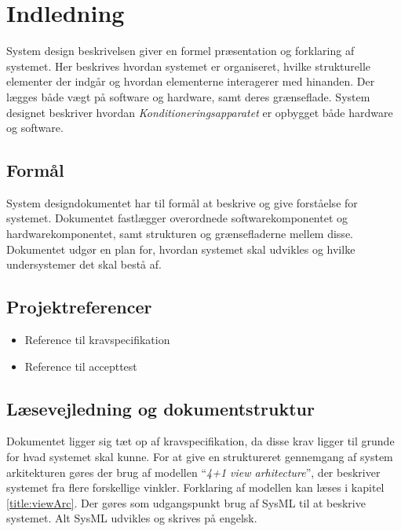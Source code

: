 	\chapter{Indledning}
	System design beskrivelsen giver en formel præsentation og forklaring af systemet. Her beskrives hvordan systemet er organiseret, hvilke strukturelle elementer der indgår og hvordan elementerne interagerer med hinanden. Der lægges både vægt på software og hardware, samt deres grænseflade. System designet beskriver hvordan \textit{Konditioneringsapparatet} er opbygget både hardware og software.
	
	\section{Formål}
	System designdokumentet har til formål at beskrive og give forståelse for systemet. Dokumentet fastlægger overordnede softwarekomponentet og hardwarekomponentet, samt strukturen og grænsefladerne mellem disse. Dokumentet udgør en plan for, hvordan systemet skal udvikles og hvilke undersystemer det skal bestå af. 
	
	\section{Projektreferencer}
	\begin{itemize}
		\item Reference til kravspecifikation
		\item Reference til accepttest
	\end{itemize}
	
	\section{Læsevejledning og dokumentstruktur}
	Dokumentet ligger sig tæt op af kravspecifikation, da disse krav ligger til grunde for hvad systemet skal kunne. For at give en struktureret gennemgang af system arkitekturen gøres der brug af modellen “\textit{4+1 view arhitecture}”, der beskriver systemet fra flere forskellige vinkler. Forklaring af modellen kan læses i kapitel \ref{title:viewArc}. Der gøres som udgangspunkt brug af SysML til at beskrive systemet. Alt SysML udvikles og skrives på engelsk. 

